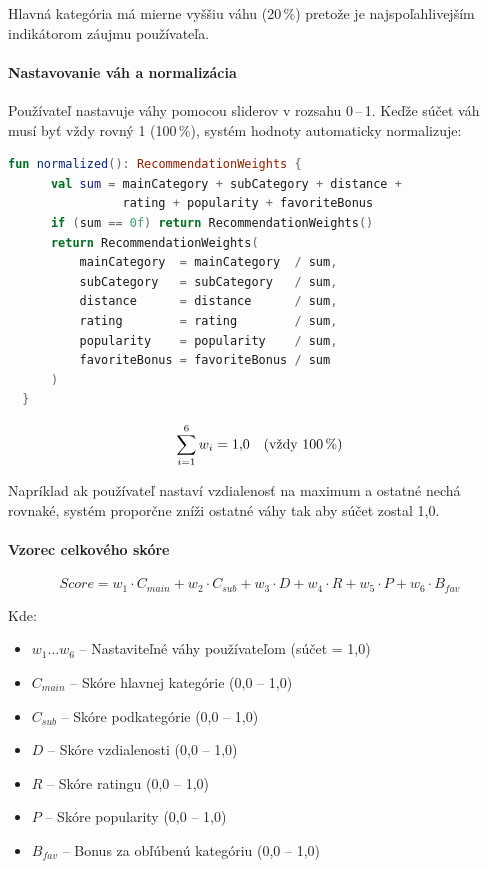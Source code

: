   Hlavná kategória má mierne vyššiu váhu (20\,\%) pretože je najspoľahlivejším
  indikátorom záujmu používateľa.

  \paragraph{Nastavovanie váh a normalizácia}

  Používateľ nastavuje váhy pomocou sliderov v rozsahu 0\,--\,1.
  Keďže súčet váh musí byť vždy rovný 1 (100\,\%), systém hodnoty automaticky
  normalizuje:

  \begin{lstlisting}[language=Kotlin, caption=Normalizácia váh]
  fun normalized(): RecommendationWeights {
      val sum = mainCategory + subCategory + distance +
                rating + popularity + favoriteBonus
      if (sum == 0f) return RecommendationWeights()
      return RecommendationWeights(
          mainCategory  = mainCategory  / sum,
          subCategory   = subCategory   / sum,
          distance      = distance      / sum,
          rating        = rating        / sum,
          popularity    = popularity    / sum,
          favoriteBonus = favoriteBonus / sum
      )
  }
  \end{lstlisting}

  \begin{equation}
  \sum_{i=1}^{6} w_i = 1{,}0 \quad \text{(vždy 100\,\%)}
  \end{equation}

  Napríklad ak používateľ nastaví vzdialenosť na maximum a ostatné nechá rovnaké,
  systém proporčne zníži ostatné váhy tak aby súčet zostal 1,0.

  \paragraph{Vzorec celkového skóre}

  \begin{equation}
  \boxed{
  Score = w_1 \cdot C_{main} + w_2 \cdot C_{sub} + w_3 \cdot D +
          w_4 \cdot R + w_5 \cdot P + w_6 \cdot B_{fav}
  }
  \end{equation}

  Kde:
  \begin{itemize}
      \item $w_1 \ldots w_6$ -- Nastaviteľné váhy používateľom (súčet = 1,0)
      \item $C_{main}$ -- Skóre hlavnej kategórie (0,0 -- 1,0)
      \item $C_{sub}$ -- Skóre podkategórie (0,0 -- 1,0)
      \item $D$ -- Skóre vzdialenosti (0,0 -- 1,0)
      \item $R$ -- Skóre ratingu (0,0 -- 1,0)
      \item $P$ -- Skóre popularity (0,0 -- 1,0)
      \item $B_{fav}$ -- Bonus za obľúbenú kategóriu (0,0 -- 1,0)
  \end{itemize}

